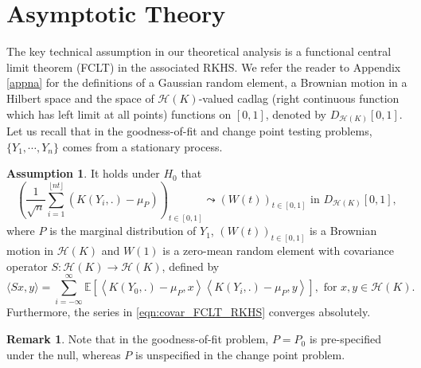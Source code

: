 \documentclass[11pt]{article}
\newcommand{\bE}{\mathbb{E}}
\theoremstyle{plain}
\theoremstyle{definition}
\newtheorem{assumption}{Assumption}
\newtheorem{remark}{Remark}
\theoremstyle{remark}
\begin{document}
\section{Asymptotic Theory}\label{sec:theory}
The key technical assumption in our theoretical analysis is a functional central limit theorem (FCLT) in the associated RKHS. We refer the reader to Appendix \ref{appna} for the definitions of a Gaussian random element, a Brownian motion in a Hilbert space and the space of $\mathcal{H}(K)$-valued cadlag (right continuous function which has left limit at all points) functions on $[0,1]$, denoted by $D_{\mathcal{H}(K)}[0,1]$. Let us recall that in the goodness-of-fit and change point testing problems, $\{Y_1,\cdots,Y_n\}$ comes from a stationary process.
\begin{assumption}\label{ass:FCLT_GOF_NULL}
    It holds under $H_0$ that
    \begin{equation}\label{eqn:FCLT_RKHS}
    \left(\frac{1}{\sqrt{n}} \sum_{i=1}^{\lfloor n t\rfloor}\left(K(Y_i,.)-\mu_P\right)\right)_{t \in[0,1]} \leadsto (W(t))_{t \in[0,1]}\text{ in } D_{\mathcal{H}(K)}[0,1],
\end{equation}
where $P$ is the marginal distribution of $Y_1$, $(W(t))_{t \in[0,1]}$ is a Brownian motion in $\mathcal{H}(K)$ and $W(1)$ is a zero-mean random element with covariance operator $S: \mathcal{H}(K) \rightarrow \mathcal{H}(K)$, defined by
\begin{equation}\label{eqn:covar_FCLT_RKHS}
    \langle S x, y\rangle=\sum_{i=-\infty}^{\infty} \bE\left[\left\langle K(Y_0,.)-\mu_P, x\right\rangle\left\langle K(Y_i,.)-\mu_P, y\right\rangle\right], \text { for } x, y \in \mathcal{H}(K) .
\end{equation}
Furthermore, the series in \eqref{eqn:covar_FCLT_RKHS} converges absolutely.
\end{assumption}
\begin{remark}
    Note that in the goodness-of-fit problem, $P=P_0$ is pre-specified under the null, whereas $P$ is unspecified in the change point problem.
\end{remark}
\end{document}
